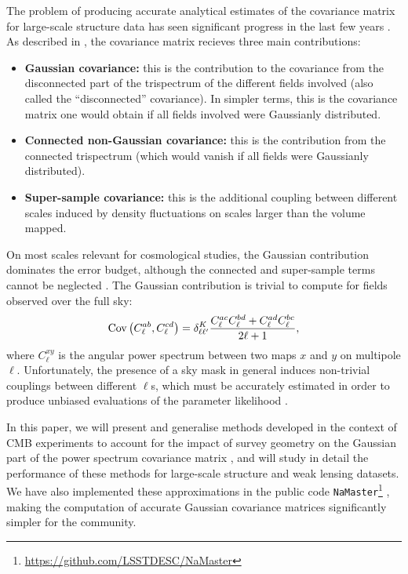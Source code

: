 \documentclass[a4paper,11pt]{article}
\begin{document}
    The problem of producing accurate analytical estimates of the covariance matrix for large-scale structure data has seen significant progress in the last few years \cite{2001ApJ...554...56C,2009ApJ...701..945S,2009MNRAS.395.2065T,2013PhRvD..87l3504T,2014MNRAS.441.2456T,2016PhRvD..94f3533P}. As described in \cite{2018JCAP...10..053B}, the covariance matrix recieves three main contributions:
    \begin{itemize}
      \item {\bf Gaussian covariance:} this is the contribution to the covariance from the disconnected part of the trispectrum of the different fields involved (also called the ``disconnected'' covariance). In simpler terms, this is the covariance matrix one would obtain if all fields involved were Gaussianly distributed.
      \item {\bf Connected non-Gaussian covariance:} this is the contribution
        from the connected trispectrum (which would vanish if all fields were
        Gaussianly distributed).
      \item {\bf Super-sample covariance:} this is the additional coupling between different scales induced by density fluctuations on scales larger than the volume mapped.
    \end{itemize}
  
    On most scales relevant for cosmological studies, the Gaussian contribution dominates the error budget, although the connected and super-sample terms cannot be neglected \cite{2018JCAP...10..053B}. The Gaussian contribution is trivial to compute for fields observed over the full sky:
    \begin{equation}\label{eq:cov_naive}
      {\rm Cov}\left(C^{ab}_\ell,C^{cd}_\ell\right)=\delta^K_{\ell\ell'}\frac{C^{ac}_\ell C^{bd}_\ell+C^{ad}_\ell C^{bc}_\ell}{2\ell+1},
    \end{equation}
    where $C^{xy}_\ell$ is the angular power spectrum between two maps $x$ and $y$ on multipole $\ell$. Unfortunately, the presence of a sky mask in general induces non-trivial couplings between different $\ell$s, which must be accurately estimated in order to produce unbiased evaluations of the parameter likelihood \cite{2018MNRAS.479.4998T}.
  
    In this paper, we will present and generalise methods developed in the context of CMB experiments to account for the impact of survey geometry on the Gaussian part of the power spectrum covariance matrix \cite{2004MNRAS.349..603E,2005MNRAS.360.1262B,2017A&A...602A..41C}, and will study in detail the performance of these methods for large-scale structure and weak lensing datasets. We have also implemented these approximations in the public code {\tt NaMaster}\footnote{\url{https://github.com/LSSTDESC/NaMaster}} \cite{2019MNRAS.484.4127A}, making the computation of accurate Gaussian covariance matrices significantly simpler for the community.
\end{document}
